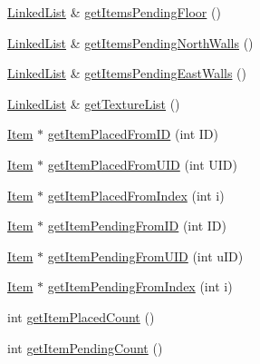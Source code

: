 \begin{DoxyCompactItemize}
\item 
\hyperlink{classLinkedList}{Linked\-List} \& \hyperlink{classShipItems_ab23eaeae958ff5d19843daf9a26948fe}{get\-Items\-Pending\-Floor} ()
\item 
\hyperlink{classLinkedList}{Linked\-List} \& \hyperlink{classShipItems_ab80fb1f4389cb89879aa3001a7e13ba3}{get\-Items\-Pending\-North\-Walls} ()
\item 
\hyperlink{classLinkedList}{Linked\-List} \& \hyperlink{classShipItems_a24260da3cc2e9fc75d64e5bfebae0870}{get\-Items\-Pending\-East\-Walls} ()
\item 
\hyperlink{classLinkedList}{Linked\-List} \& \hyperlink{classShipItems_ae6e53eb02579b4e64ad640ba56fe3759}{get\-Texture\-List} ()
\item 
\hyperlink{classItem}{Item} $\ast$ \hyperlink{classShipItems_aaebf0d993affd21ec619233e0e654ae7}{get\-Item\-Placed\-From\-I\-D} (int I\-D)
\item 
\hyperlink{classItem}{Item} $\ast$ \hyperlink{classShipItems_a7204e19a3782177c271deddcd437af77}{get\-Item\-Placed\-From\-U\-I\-D} (int U\-I\-D)
\item 
\hyperlink{classItem}{Item} $\ast$ \hyperlink{classShipItems_a88b0664405e31a83c8ea42082f13dfc8}{get\-Item\-Placed\-From\-Index} (int i)
\item 
\hyperlink{classItem}{Item} $\ast$ \hyperlink{classShipItems_aa79604b85e2271567b30926eecedeb53}{get\-Item\-Pending\-From\-I\-D} (int I\-D)
\item 
\hyperlink{classItem}{Item} $\ast$ \hyperlink{classShipItems_ac02604d50a2f4926821b963d1abba9a4}{get\-Item\-Pending\-From\-U\-I\-D} (int u\-I\-D)
\item 
\hyperlink{classItem}{Item} $\ast$ \hyperlink{classShipItems_a194911994a15932faa60a08a6258f122}{get\-Item\-Pending\-From\-Index} (int i)
\item 
int \hyperlink{classShipItems_ad48bad514797b873e253cf21a7d40288}{get\-Item\-Placed\-Count} ()
\item 
int \hyperlink{classShipItems_a9473269de6b8e8f7bdd41236ea294c1b}{get\-Item\-Pending\-Count} ()
\end{DoxyCompactItemize}
